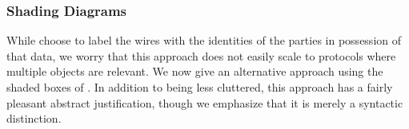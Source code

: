 %
%
%

\subsubsection{Shading Diagrams}
While \cite{broadbent-karvonen-2022} choose to label the wires with the
identities of the parties in possession of that data, we worry that this
approach does not easily scale to protocols where multiple objects are relevant.
We now give an alternative approach using the shaded boxes of
. In addition
to being less cluttered, this approach has a fairly pleasant abstract
justification, though we emphasize that it is merely a syntactic distinction.

